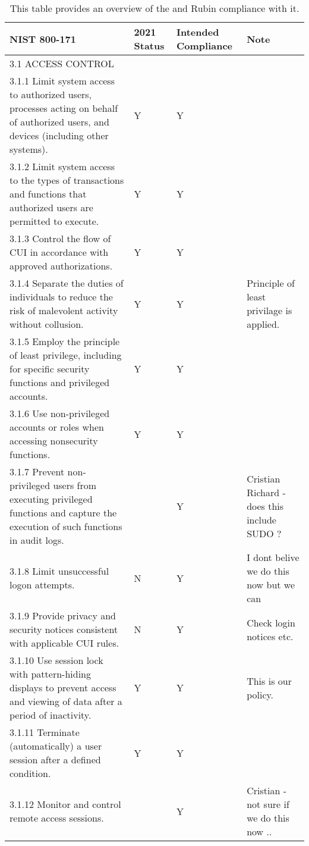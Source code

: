 \tiny \begin{longtable} {|p{}|p{}|p{}|p{} |} \caption{This table provides an overview of the  and Rubin compliance with it. \label{tab:compliance}}\\ 
\hline 
\textbf{NIST 800-171}&\textbf{2021 Status}&\textbf{Intended Compliance}&\textbf{Note} \\ \hline
{3.1 ACCESS CONTROL}&&& \\ \hline
{3.1.1 Limit system access to authorized users, processes acting on behalf of authorized users, and devices (including other systems).}&{Y}&{Y}& \\ \hline
{3.1.2 Limit system access to the types of transactions and functions that authorized users are permitted to execute.}&{Y}&{Y}& \\ \hline
{3.1.3 Control the flow of CUI in accordance with approved authorizations.}&{Y}&{Y}& \\ \hline
{3.1.4 Separate the duties of individuals to reduce the risk of malevolent activity without collusion.}&{Y}&{Y}&{Principle of least privilage is applied.} \\ \hline
{3.1.5 Employ the principle of least privilege, including for specific security functions and privileged accounts.}&{Y}&{Y}& \\ \hline
{3.1.6 Use non-privileged accounts or roles when accessing nonsecurity functions.}&{Y}&{Y}& \\ \hline
{3.1.7 Prevent non-privileged users from executing privileged functions and capture the execution of such functions in audit logs.}&{}&{Y}&{Cristian \/ Richard  - does this include SUDO ?} \\ \hline
{3.1.8 Limit unsuccessful logon attempts.}&{N}&{Y}&{I dont belive we do this now but we can } \\ \hline
{3.1.9 Provide privacy and security notices consistent with applicable CUI rules.}&{N}&{Y}&{Check login notices etc.} \\ \hline
{3.1.10 Use session lock with pattern-hiding displays to prevent access and viewing of data after a period of inactivity.}&{Y}&{Y}&{This is our policy.} \\ \hline
{3.1.11 Terminate (automatically) a user session after a defined condition.}&{Y}&{Y}& \\ \hline
{3.1.12 Monitor and control remote access sessions.}&{}&{Y}&{Cristian - not sure if we do this now .. } \\ \hline

\end{longtable}
